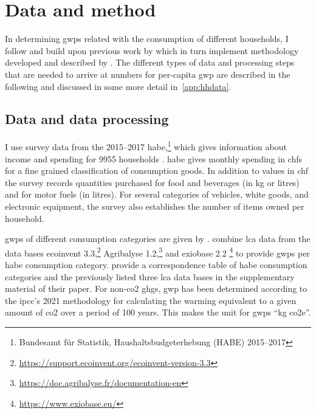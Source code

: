 \documentclass[a4paper,11pt,abstract=true]{scrartcl}
\begin{document}
\section{Data and method}
\label{sec:dat_meth}

In determining \acp{gwp} related with the consumption of different households, I follow and build upon previous work by \citet{jakobs_nfp73_2023}  which in turn implement methodology developed and described by \citet{froemelt_using_2018}.
The different types of data and processing steps that are needed to arrive at numbers for per-capita \ac{gwp} are described in the following and discussed in some more detail in~\ref{app:hhdata}.

\subsection*{Data and data processing}
I use survey data from the 2015--2017 \ac{habe},\footnote{%
  Bundesamt für Statistik, Haushaltsbudgeterhebung (HABE) 2015--2017
} which gives information about income and spending for 9955 households \citep[see][for more information]{oetliker_haushaltsbudgeterhebung_2022}.
\ac{habe} gives monthly spending in \acp{chf} for a fine grained classification of consumption goods.
In addition to values in \ac{chf} the survey records quantities purchased for food and beverages (in kg or litres) and for motor fuels (in litres).
For several categories of vehicles,  white goods, and electronic equipment, the survey also establishes the number of items owned per household.

\acp{gwp} of different consumption categories are given by \citet{jakobs_nfp73_2023}.
\citeauthor{jakobs_nfp73_2023} combine \ac{lca} data from the data bases
ecoinvent 3.3,\footnote{\url{https://support.ecoinvent.org/ecoinvent-version-3.3}}
Agribalyse 1.2,\footnote{\url{https://doc.agribalyse.fr/documentation-en}} and
exiobase 2.2 \citep{wood_global_2015}\footnote{\url{https://www.exiobase.eu/}}
to provide \acp{gwp} per \ac{habe} consumption category.
\citet{froemelt_using_2018} provide a correspondence table of \ac{habe} consumption categories and the previously listed three \ac{lca} data bases in the supplementary material of their paper.
For non-\ac{co2} \aclp{ghg}, \ac{gwp} has been determined according to the \ac{ipcc}'s 2021 methodology for calculating the warming equivalent to a given amount of \ac{co2} over a period of 100 years.
This makes the unit for \acp{gwp} ``kg \ac{co2e}''.
\end{document}
